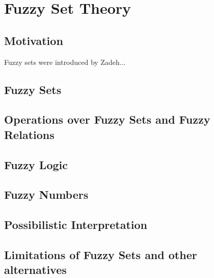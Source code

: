 \chapter{Fuzzy Set Theory}
\section*{Motivation}
Fuzzy sets were introduced by Zadeh...

\section{Fuzzy Sets}

\section{Operations over Fuzzy Sets and Fuzzy Relations}

\section{Fuzzy Logic}\label{sec:fuzzy_logic}

\section{Fuzzy Numbers}\label{sec:fuzzy_numbers}

\section{Possibilistic Interpretation}

\section{Limitations of Fuzzy Sets and other alternatives}